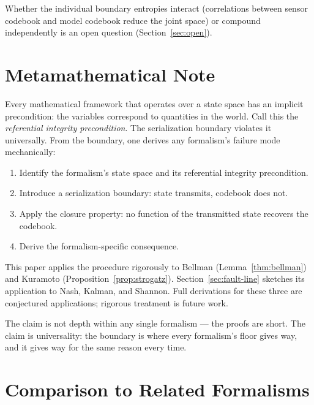 \documentclass[11pt,a4paper]{article}
\begin{document}
Whether the individual boundary entropies interact (correlations 
between sensor codebook and model codebook reduce the joint space) 
or compound independently is an open question 
(Section~\ref{sec:open}).


\section{Metamathematical Note}
\label{sec:metamath}

Every mathematical framework that operates over a state space has an 
implicit precondition: the variables correspond to quantities in the 
world. Call this the \emph{referential integrity precondition}. The 
serialization boundary violates it universally. From the boundary, 
one derives any formalism's failure mode mechanically:

\begin{enumerate}
    \item Identify the formalism's state space and its referential 
    integrity precondition.
    \item Introduce a serialization boundary: state transmits, 
    codebook does not.
    \item Apply the closure property: no function of the transmitted 
    state recovers the codebook.
    \item Derive the formalism-specific consequence.
\end{enumerate}

This paper applies the procedure rigorously to Bellman 
(Lemma~\ref{thm:bellman}) and Kuramoto 
(Proposition~\ref{prop:strogatz}). Section~\ref{sec:fault-line} 
sketches its application to Nash, Kalman, and Shannon. Full 
derivations for these three are conjectured applications; rigorous 
treatment is future work.

The claim is not depth within any single formalism --- the proofs 
are short. The claim is universality: the boundary is where every 
formalism's floor gives way, and it gives way for the same reason 
every time.


\section{Comparison to Related Formalisms}
\label{sec:comparison}
\end{document}
